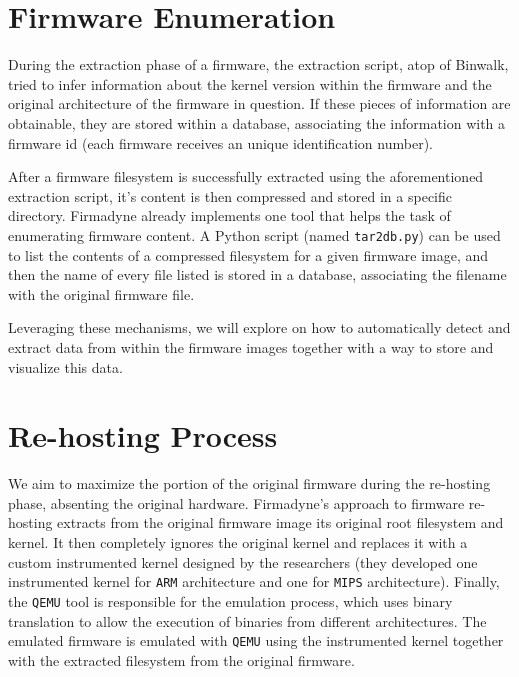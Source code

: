\section{Firmware Enumeration}

During the extraction phase of a firmware, the extraction script, atop of Binwalk, tried to infer information about the kernel version within the firmware and the original architecture of the firmware in question. If these pieces of information are obtainable, they are stored within a database, associating the information with a firmware id (each firmware receives an unique identification number).

After a firmware filesystem is successfully extracted using the aforementioned extraction script, it's content is then compressed and stored in a specific directory. Firmadyne already implements one tool that helps the task of enumerating firmware content. A Python script (named {\tt tar2db.py}) can be used to list the contents of a compressed filesystem for a given firmware image, and then the name of every file listed is stored in a database, associating the filename with the original firmware file.

Leveraging these mechanisms, we will explore on how to automatically detect and extract data from within the firmware images together with a way to store and visualize this data.

\section{Re-hosting Process}
\label{sec:re-hosting}

We aim to maximize the portion of the original firmware during the re-hosting phase, absenting the original hardware. Firmadyne's approach to firmware re-hosting extracts from the original firmware image its original root filesystem and kernel. It then completely ignores the original kernel and replaces it with a custom instrumented kernel designed by the researchers (they developed one instrumented kernel for {\tt ARM} architecture and one for {\tt MIPS} architecture). Finally, the {\tt QEMU} tool is responsible for the emulation process, which uses binary translation to allow the execution of binaries from different architectures. The emulated firmware is emulated with {\tt QEMU} using the instrumented kernel together with the extracted filesystem from the original firmware.

